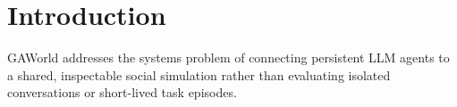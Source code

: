 \section{Introduction}
GAWorld addresses the systems problem of connecting persistent LLM agents to a shared, inspectable social
simulation rather than evaluating isolated conversations or short-lived task episodes.
